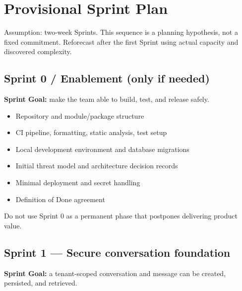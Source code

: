 \chapter{Provisional Sprint Plan}

Assumption: two-week Sprints. This sequence is a planning hypothesis, not a fixed commitment. Reforecast after the first Sprint using actual capacity and discovered complexity.







\section{Sprint 0 / Enablement (only if needed)}

\textbf{Sprint Goal:} make the team able to build, test, and release safely.

\begin{itemize}
\item Repository and module/package structure
\item CI pipeline, formatting, static analysis, test setup
\item Local development environment and database migrations
\item Initial threat model and architecture decision records
\item Minimal deployment and secret handling
\item Definition of Done agreement
\end{itemize}
Do not use Sprint 0 as a permanent phase that postpones delivering product value.



\section{Sprint 1 --- Secure conversation foundation}

\textbf{Sprint Goal:} a tenant-scoped conversation and message can be created, persisted, and retrieved.

